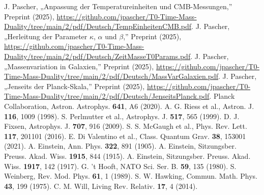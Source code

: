 \documentclass[twocolumn,aps,prl]{revtex4-2}
\begin{document}
\begin{thebibliography}{99}
		 J. Pascher, „Anpassung der Temperatureinheiten und CMB-Messungen,'' Preprint (2025), \url{https://github.com/jpascher/T0-Time-Mass-Duality/tree/main/2/pdf/Deutsch/TempEinheitenCMB.pdf}.
		 J. Pascher, „Herleitung der Parameter $\kappa$, $\alpha$ und $\beta$,'' Preprint (2025), \url{https://github.com/jpascher/T0-Time-Mass-Duality/tree/main/2/pdf/Deutsch/ZeitMasseT0Params.pdf}.
		 J. Pascher, „Massenvariation in Galaxien,'' Preprint (2025), \url{https://github.com/jpascher/T0-Time-Mass-Duality/tree/main/2/pdf/Deutsch/MassVarGalaxien.pdf}.
		 J. Pascher, „Jenseits der Planck-Skala,'' Preprint (2025), \url{https://github.com/jpascher/T0-Time-Mass-Duality/tree/main/2/pdf/Deutsch/JenseitsPlanck.pdf}.
		 Planck Collaboration, Astron. Astrophys. \textbf{641}, A6 (2020).
		 A. G. Riess et al., Astron. J. \textbf{116}, 1009 (1998).
		 S. Perlmutter et al., Astrophys. J. \textbf{517}, 565 (1999).
		 D. J. Fixsen, Astrophys. J. \textbf{707}, 916 (2009).
		 S. S. McGaugh et al., Phys. Rev. Lett. \textbf{117}, 201101 (2016).
		 E. Di Valentino et al., Class. Quantum Grav. \textbf{38}, 153001 (2021).
		 A. Einstein, Ann. Phys. \textbf{322}, 891 (1905).
		 A. Einstein, Sitzungsber. Preuss. Akad. Wiss. \textbf{1915}, 844 (1915).
		 A. Einstein, Sitzungsber. Preuss. Akad. Wiss. \textbf{1917}, 142 (1917).
		 G. 't Hooft, NATO Sci. Ser. B. \textbf{59}, 135 (1980).
		 S. Weinberg, Rev. Mod. Phys. \textbf{61}, 1 (1989).
		 S. W. Hawking, Commun. Math. Phys. \textbf{43}, 199 (1975).
		 C. M. Will, Living Rev. Relativ. \textbf{17}, 4 (2014).
	\end{thebibliography}
	
\end{document}
